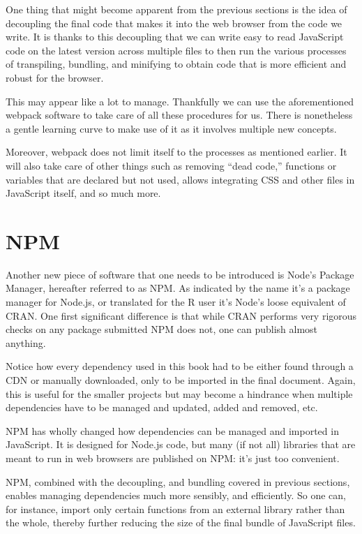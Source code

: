 \documentclass[
]{krantz}
\begin{document}
One thing that might become apparent from the previous sections is the idea of decoupling the final code that makes it into the web browser from the code we write. It is thanks to this decoupling that we can write easy to read JavaScript code on the latest version across multiple files to then run the various processes of transpiling, bundling, and minifying to obtain code that is more efficient and robust for the browser.

This may appear like a lot to manage. Thankfully we can use the aforementioned webpack software to take care of all these procedures for us. There is nonetheless a gentle learning curve to make use of it as it involves multiple new concepts.

Moreover, webpack does not limit itself to the processes as mentioned earlier. It will also take care of other things such as removing ``dead code,'' functions or variables that are declared but not used, allows integrating CSS and other files in JavaScript itself, and so much more.

\hypertarget{webpack-npm}{%
\section{NPM}\label{webpack-npm}}

Another new piece of software that one needs to be introduced is Node's Package Manager, hereafter referred to as NPM. As indicated by the name it's a package manager for Node.js, or translated for the R user it's Node's loose equivalent of CRAN. One first significant difference is that while CRAN performs very rigorous checks on any package submitted NPM does not, one can publish almost anything.

Notice how every dependency used in this book had to be either found through a CDN or manually downloaded, only to be imported in the final document. Again, this is useful for the smaller projects but may become a hindrance when multiple dependencies have to be managed and updated, added and removed, etc.

NPM has wholly changed how dependencies can be managed and imported in JavaScript. It is designed for Node.js code, but many (if not all) libraries that are meant to run in web browsers are published on NPM: it's just too convenient.

NPM, combined with the decoupling, and bundling covered in previous sections, enables managing dependencies much more sensibly, and efficiently. So one can, for instance, import only certain functions from an external library rather than the whole, thereby further reducing the size of the final bundle of JavaScript files.
\end{document}

